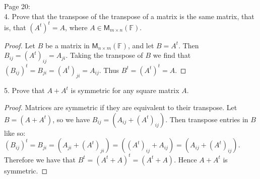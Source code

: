 \documentclass[11pt]{article}
\newcommand{\br}[1]{\left(#1\right)}
\begin{document}
Page 20: \\

4. Prove that the transpose of the transpose of a matrix is the same matrix, that is, that $\br{A^t}^t = A$, where $A\in \mathsf{M}_{m\times n}\br{\mathbb{F}}$.

\begin{proof}
    Let $B$ be a matrix in $\mathsf{M}_{n\times m}\br{\mathbb{F}}$, and let $B = A^t$. Then $B_{ij} = \br{A^t}_{ij} = A_{ji}$. Taking the transpose of $B$ we find that $\br{B_{ij}}^t = B_{ji} = \br{A^t}_{ji} = A_{ij}$. Thus $B^t = \br{A^t}^t = A$.
\end{proof}

5. Prove that $A+A^t$ is symmetric for any square matrix $A$.

\begin{proof}
    Matrices are symmetric if they are equivalent to their transpose. Let $B = \br{A+A^t}$, so we have $B_{ij} = \br{A_{ij} + \br{A^t}_{ij}}$. Then transpose entries in $B$ like so: $\br{B_{ij}}^t = B_{ji} = \br{A_{ji} + \br{A^t}_{ji}} = \br{\br{A^t}_{ij} + A_{ij}} = \br{A_{ij} + \br{A^t}_{ij}}$. Therefore we have that $B^t = \br{A^t+A}^t = \br{A^t+A}$. Hence $A+A^t$ is symmetric.
\end{proof}
\end{document}
